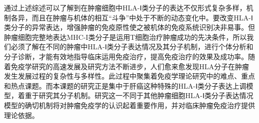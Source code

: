 通过上述综述可以了解到在肿瘤细胞中HLA-Ⅰ类分子的表达不仅形式复杂多样，机制各异，而且在肿瘤与机体的相互“斗争”中处于不断的动态变化中。要改变HLA-Ⅰ类分子的异常表达，增强肿瘤的免疫原性使之被机体的免疫系统识别决非易事。但肿瘤细胞完整地表达MHC-I类分子是运用T细胞治疗肿瘤成功的先决条件，所以我们必须了解在不同的肿瘤中HLA-Ⅰ类分子表达情况及其分子机制，进行个体分析和分子诊断，才能有效地指导临床运用免疫治疗，提高免疫治疗的效果及成功率。随着免疫学研究的高速发展及研究方法不断进步，人们愈来愈发现HLA分子在肿瘤发生发展过程的复杂性与多样性。此过程中聚集着免疫学理论研究中的难点、重点和热点课题。而本课题的研究正是集中于肝癌这种特殊的HLA-Ⅰ类分子表达上调模型，着重于研究其分子机制。研究这一不同于其他肿瘤细胞HLA-Ⅰ类分子表达情况模型的确切机制将对肿瘤免疫学的认识起着重要作用，并对临床肿瘤免疫治疗提供理论依据。


